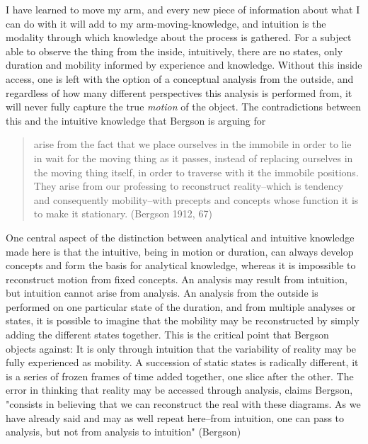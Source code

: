 \documentclass[11pt]{article}
\makeatletter
\newcommand{\cslcitation}[2]
 {\protect\hyper@linkstart{cite}{citeproc_bib_item_#1}#2\hyper@linkend}
\makeatother
\begin{document}
I have learned to move my arm, and every new piece of information about what I can do with it will add to my arm-moving-knowledge, and intuition is the modality through which knowledge about the process is gathered.
For a subject able to observe the thing from the inside, intuitively, there are no states, only duration and mobility informed by experience and knowledge.  
Without this inside access, one is left with the option of a conceptual analysis from the outside, and regardless of how many different perspectives this analysis is performed from, it will never fully capture the true \emph{motion} of the object.
The contradictions between this and the intuitive knowledge that Bergson is arguing for
\begin{quote}
arise from the fact that we place ourselves in the immobile in order to lie in wait for the moving thing as it passes, instead of replacing ourselves in the moving thing itself, in order to traverse with it the immobile positions. They arise from our professing to reconstruct reality--which is tendency and consequently mobility--with precepts and concepts whose function it is to make it stationary. (\cslcitation{2}{Bergson 1912, 67})
\end{quote}

One central aspect of the distinction between analytical and intuitive knowledge made here is that the intuitive, being in motion or duration, can always develop concepts and form the basis for analytical knowledge, whereas it is impossible to reconstruct motion from fixed concepts.
An analysis may result from intuition, but intuition cannot arise from analysis.
An analysis from the outside is performed on one particular state of the duration, and from multiple analyses or states, it is possible to imagine that the mobility may be reconstructed by simply adding the different states together.
This is the critical point that Bergson objects against:
It is only through intuition that the variability of reality may be fully experienced as mobility.
A succession of static states is radically different, it is a series of frozen frames of time added together, one slice after the other.
The error in thinking that reality may be accessed through analysis, claims Bergson, "consists in believing that we can reconstruct the real with these diagrams. As we have already said and may as well repeat here--from intuition, one can pass to analysis, but not from analysis to intuition" (\cslcitation{2}{Bergson}) 
\end{document}
